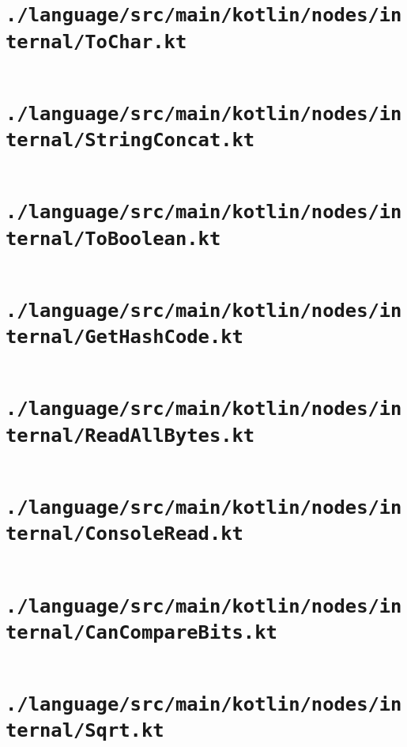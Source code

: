 \documentclass[a4paper, 11pt]{report}
\begin{document}
    \section{\lstinline{./language/src/main/kotlin/nodes/internal/ToChar.kt}}
    \inputminted{kotlin}{./language/src/main/kotlin/nodes/internal/ToChar.kt}


    \section{\lstinline{./language/src/main/kotlin/nodes/internal/StringConcat.kt}}
    \inputminted{kotlin}{./language/src/main/kotlin/nodes/internal/StringConcat.kt}


    \section{\lstinline{./language/src/main/kotlin/nodes/internal/ToBoolean.kt}}
    \inputminted{kotlin}{./language/src/main/kotlin/nodes/internal/ToBoolean.kt}


    \section{\lstinline{./language/src/main/kotlin/nodes/internal/GetHashCode.kt}}
    \inputminted{kotlin}{./language/src/main/kotlin/nodes/internal/GetHashCode.kt}


    \section{\lstinline{./language/src/main/kotlin/nodes/internal/ReadAllBytes.kt}}
    \inputminted{kotlin}{./language/src/main/kotlin/nodes/internal/ReadAllBytes.kt}


    \section{\lstinline{./language/src/main/kotlin/nodes/internal/ConsoleRead.kt}}
    \inputminted{kotlin}{./language/src/main/kotlin/nodes/internal/ConsoleRead.kt}


    \section{\lstinline{./language/src/main/kotlin/nodes/internal/CanCompareBits.kt}}
    \inputminted{kotlin}{./language/src/main/kotlin/nodes/internal/CanCompareBits.kt}


    \section{\lstinline{./language/src/main/kotlin/nodes/internal/Sqrt.kt}}
    \inputminted{kotlin}{./language/src/main/kotlin/nodes/internal/Sqrt.kt}
\end{document}
